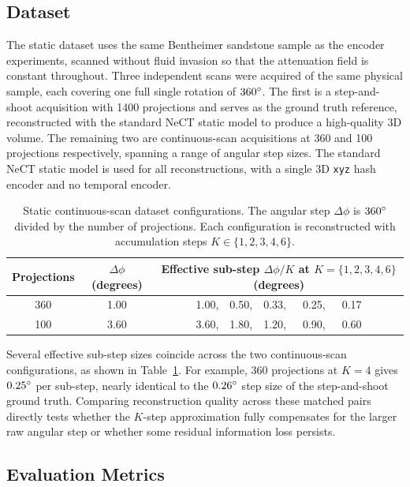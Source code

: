 \documentclass[12pt, a4paper, twoside]{report}
\begin{document}
\subsection{Dataset}
\label{subsec:cont_static_dataset}

The static dataset uses the same Bentheimer sandstone sample as the encoder experiments, scanned without fluid invasion so that the attenuation field is constant throughout. Three independent scans were acquired of the same physical sample, each covering one full single rotation of $360\degree$. The first is a step-and-shoot acquisition with 1400 projections and serves as the ground truth reference, reconstructed with the standard NeCT static model to produce a high-quality 3D volume. The remaining two are continuous-scan acquisitions at 360 and 100 projections respectively, spanning a range of angular step sizes. The standard NeCT static model is used for all reconstructions, with a single 3D \texttt{xyz} hash encoder and no temporal encoder.

\begin{table}[h]
    \centering
    \caption{Static continuous-scan dataset configurations. The angular step $\Delta\phi$ is $360\degree$ divided by the number of projections. Each configuration is reconstructed with accumulation steps $K \in \{1, 2, 3, 4, 6\}$.}
    \label{tab:static_cont_configs}
    \begin{tabular}{ccc}
        \toprule
        Projections & $\Delta\phi$ (degrees) & Effective sub-step $\Delta\phi / K$ at $K = \{1, 2, 3, 4, 6\}$ (degrees) \\
        \midrule
        360  & 1.00 & 1.00,\ \ 0.50,\ \ 0.33,\ \ \ 0.25,\ \ \ 0.17  \\
        100  & 3.60 & 3.60,\ \ 1.80,\ \ 1.20,\ \ \ 0.90,\ \ \ 0.60  \\
        \bottomrule
    \end{tabular}
\end{table}

Several effective sub-step sizes coincide across the two continuous-scan configurations, as shown in Table~\ref{tab:static_cont_configs}. For example, 360 projections at $K = 4$ gives $0.25\degree$ per sub-step, nearly identical to the $0.26\degree$ step size of the step-and-shoot ground truth. Comparing reconstruction quality across these matched pairs directly tests whether the $K$-step approximation fully compensates for the larger raw angular step or whether some residual information loss persists.

\subsection{Evaluation Metrics}
\label{subsec:cont_static_metrics}
\end{document}
